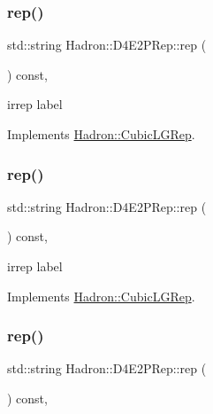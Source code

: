 \subsubsection{\texorpdfstring{rep()}{rep()}\hspace{0.1cm}{\footnotesize\ttfamily [1/3]}}
{\footnotesize\ttfamily std\+::string Hadron\+::\+D4\+E2\+P\+Rep\+::rep (\begin{DoxyParamCaption}{ }\end{DoxyParamCaption}) const\hspace{0.3cm}{\ttfamily [inline]}, {\ttfamily [virtual]}}

irrep label 

Implements \mbox{\hyperlink{structHadron_1_1CubicLGRep_a50f5ddbb8f4be4cee0106fa9e8c75e6c}{Hadron\+::\+Cubic\+L\+G\+Rep}}.

\mbox{\label{structHadron_1_1D4E2PRep_a9cabd3c1f3fd0325a694d960a363e8b2}} 
\subsubsection{\texorpdfstring{rep()}{rep()}\hspace{0.1cm}{\footnotesize\ttfamily [2/3]}}
{\footnotesize\ttfamily std\+::string Hadron\+::\+D4\+E2\+P\+Rep\+::rep (\begin{DoxyParamCaption}{ }\end{DoxyParamCaption}) const\hspace{0.3cm}{\ttfamily [inline]}, {\ttfamily [virtual]}}

irrep label 

Implements \mbox{\hyperlink{structHadron_1_1CubicLGRep_a50f5ddbb8f4be4cee0106fa9e8c75e6c}{Hadron\+::\+Cubic\+L\+G\+Rep}}.

\mbox{\label{structHadron_1_1D4E2PRep_a9cabd3c1f3fd0325a694d960a363e8b2}} 
\subsubsection{\texorpdfstring{rep()}{rep()}\hspace{0.1cm}{\footnotesize\ttfamily [3/3]}}
{\footnotesize\ttfamily std\+::string Hadron\+::\+D4\+E2\+P\+Rep\+::rep (\begin{DoxyParamCaption}{ }\end{DoxyParamCaption}) const\hspace{0.3cm}{\ttfamily [inline]}, {\ttfamily [virtual]}}

